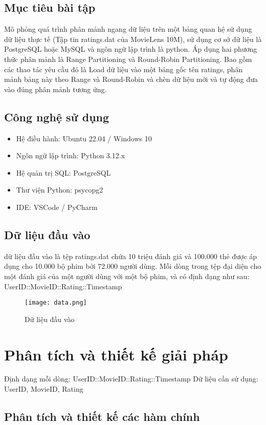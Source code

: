 \documentclass[a4paper]{article}
\begin{document}
\subsection{Mục tiêu bài tập}
Mô phỏng quá trình phân mảnh ngang dữ liệu trên một bảng quan hệ sử dụng dữ liệu thực tế (Tập tin ratings.dat của MovieLens 10M),	sử dụng cơ sở dữ liệu là PostgreSQL hoặc MySQL và ngôn ngữ lập trình là python. Áp dụng hai phương thức phân mảnh là Range Partitioning và Round-Robin Partitioning. Bao gồm các thao tác yêu cầu đó là Load dữ liệu vào một bảng gốc tên ratings, phân mảnh bảng này theo Range và Round-Robin và chèn dữ liệu mới và tự động đưa vào đúng phân mảnh tương ứng.

\subsection{Công nghệ sử dụng}
\begin{itemize}
    \item Hệ điều hành: Ubuntu 22.04 / Windows 10
    \item Ngôn ngữ lập trình: Python 3.12.x
    \item Hệ quản trị SQL: PostgreSQL
    \item Thư viện Python: psycopg2
    \item IDE: VSCode / PyCharm
\end{itemize}

\subsection{Dữ liệu đầu vào}
dữ liệu đầu vào là tệp ratings.dat chứa 10 triệu đánh giá và 100.000 thẻ được áp dụng cho 10.000 bộ phim bởi 72.000 người dùng. Mỗi dòng trong tệp đại diện cho một đánh giá của một người dùng với một 
bộ phim, và có định dạng như sau: UserID::MovieID::Rating::Timestamp

\begin{figure}[H]
    \centering
    \texttt{[image: data.png]}
    \caption{Dữ liệu đầu vào}

\end{figure}

\clearpage
\section{Phân tích và thiết kế giải pháp}
Định dạng mỗi dòng: UserID::MovieID::Rating::Timestamp
Dữ liệu cần sử dụng: UserID, MovieID, Rating


\subsection{Phân tích và thiết kế các hàm chính}
\end{document}
